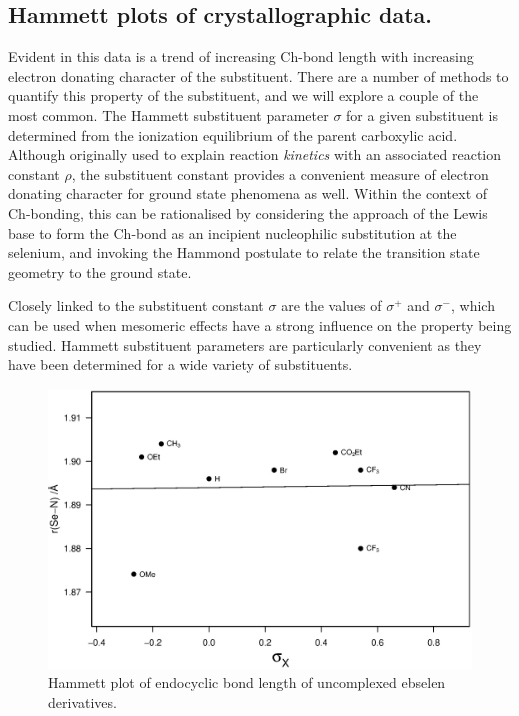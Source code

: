 \begin{refsection}
\subsection{Hammett plots of crystallographic data.}
Evident in this data is a trend of increasing Ch-bond length with increasing electron donating character of the substituent.
There are a number of methods to quantify this property of the substituent, and we will explore a couple of the most common.
The Hammett substituent parameter $\sigma$ for a given substituent is determined from the ionization equilibrium of the parent carboxylic acid.
Although originally used to explain reaction \emph{kinetics} with an associated reaction constant $\rho$, the substituent constant provides a convenient measure of electron donating character for ground state phenomena as well.
Within the context of Ch-bonding, this can be rationalised by considering the approach of the Lewis base to form the Ch-bond as an incipient nucleophilic substitution at the selenium, and invoking the Hammond postulate to relate the transition state geometry to the ground state.

Closely linked to the substituent constant $\sigma$ are the values of $\sigma^{+}$ and $\sigma^{-}$, which can be used when mesomeric effects have a strong influence on the property being studied.
Hammett substituent parameters are particularly convenient as they have been determined for a wide variety of substituents.

\begin{figure}
    \centering
    \includegraphics[width=0.9\linewidth]{Figures/hammett-endo-free.eps}
    \caption{Hammett plot of endocyclic  bond length of uncomplexed ebselen derivatives.}
    \label{fig:hammett-endo-free}
\end{figure}


\end{refsection}
